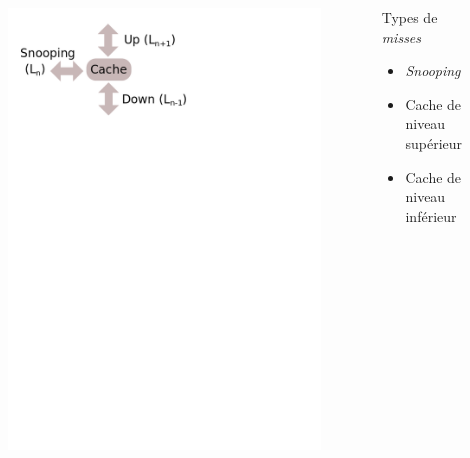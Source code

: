 \begin{frame}[fragile]
  \begin{columns}[T]
    \begin{column}{.5\textwidth}
      \begin{figure}[h!]
	\includegraphics[scale=.4]{images/misses.png}
      \end{figure}
    \end{column}
    \begin{column}{.5\textwidth}
      \bigskip
      \begin{block}{Types de \emph{misses}}
	\begin{itemize}
	\item{\emph{Snooping}}
        \item{Cache de niveau supérieur}
        \item{Cache de niveau inférieur}
	\end{itemize}
      \end{block}
    \end{column}
  \end{columns}
\end{frame}

